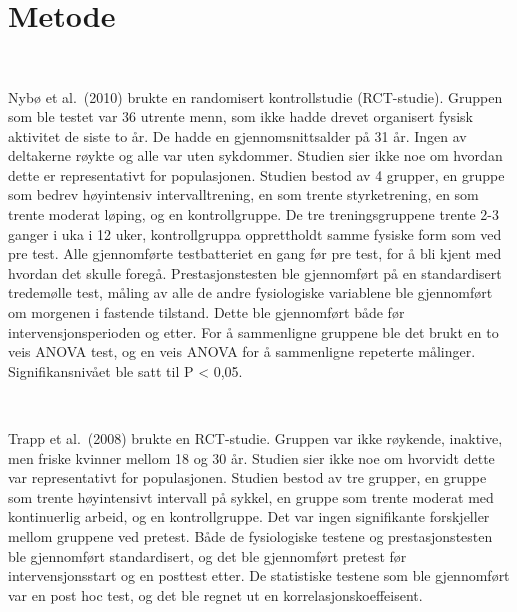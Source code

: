 \documentclass[
]{article}
\begin{document}
~

~

~

\hypertarget{metode}{%
\section{Metode}\label{metode}}

~

Nybø et al.~(2010) brukte en randomisert kontrollstudie (RCT-studie).
Gruppen som ble testet var 36 utrente menn, som ikke hadde drevet
organisert fysisk aktivitet de siste to år. De hadde en
gjennomsnittsalder på 31 år. Ingen av deltakerne røykte og alle var uten
sykdommer. Studien sier ikke noe om hvordan dette er representativt for
populasjonen. Studien bestod av 4 grupper, en gruppe som bedrev
høyintensiv intervalltrening, en som trente styrketrening, en som trente
moderat løping, og en kontrollgruppe. De tre treningsgruppene trente 2-3
ganger i uka i 12 uker, kontrollgruppa opprettholdt samme fysiske form
som ved pre test. Alle gjennomførte testbatteriet en gang før pre test,
for å bli kjent med hvordan det skulle foregå. Prestasjonstesten ble
gjennomført på en standardisert tredemølle test, måling av alle de andre
fysiologiske variablene ble gjennomført om morgenen i fastende tilstand.
Dette ble gjennomført både før intervensjonsperioden og etter. For å
sammenligne gruppene ble det brukt en to veis ANOVA test, og en veis
ANOVA for å sammenligne repeterte målinger. Signifikansnivået ble satt
til P \textless{} 0,05.

~

Trapp et al.~(2008) brukte en RCT-studie. Gruppen var ikke røykende,
inaktive, men friske kvinner mellom 18 og 30 år. Studien sier ikke noe
om hvorvidt dette var representativt for populasjonen. Studien bestod av
tre grupper, en gruppe som trente høyintensivt intervall på sykkel, en
gruppe som trente moderat med kontinuerlig arbeid, og en kontrollgruppe.
Det var ingen signifikante forskjeller mellom gruppene ved pretest. Både
de fysiologiske testene og prestasjonstesten ble gjennomført
standardisert, og det ble gjennomført pretest før intervensjonsstart og
en posttest etter. De statistiske testene som ble gjennomført var en
post hoc test, og det ble regnet ut en korrelasjonskoeffeisent.

~
\end{document}
